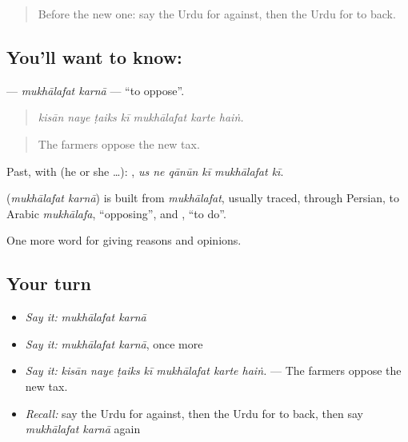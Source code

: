 \label{lesson:UR-C335-mukhalafat-karna}



\begin{quote}
Before the new one: say the Urdu for against, then the Urdu for to back.
\end{quote}

\subsection*{You'll want to know:  }
\textbf{ } — \emph{mukhālafat karnā} — \textquotedblleft{}to oppose\textquotedblright{}.

\begin{quote}
      
\end{quote}

\begin{quote}
\emph{kisān naye ṭaiks kī mukhālafat karte haiṅ.}
\end{quote}

\begin{quote}
The farmers oppose the new tax.
\end{quote}

Past, with  (he or she …):      , \emph{us ne qānūn kī mukhālafat kī}.

\begin{cousinweb}
\textbf{ } (\emph{mukhālafat karnā}) is built from \emph{mukhālafat}, usually traced, through Persian, to Arabic \emph{mukhālafa}, \textquotedblleft{}opposing\textquotedblright{}, and \textbf{}, \textquotedblleft{}to do\textquotedblright{}.
\end{cousinweb}

\begin{grammarlens}[title={What you've built}]
One more word for giving reasons and opinions.
\end{grammarlens}

\subsection*{Your turn}
\begin{itemize}
\raggedright
  \item \emph{Say it:} \emph{mukhālafat karnā}
  \item \emph{Say it:} \emph{mukhālafat karnā}, once more
  \item \emph{Say it:} \emph{kisān naye ṭaiks kī mukhālafat karte haiṅ.} — The farmers oppose the new tax.
  \item \emph{Recall:} say the Urdu for against, then the Urdu for to back, then say \emph{mukhālafat karnā} again
\end{itemize}

